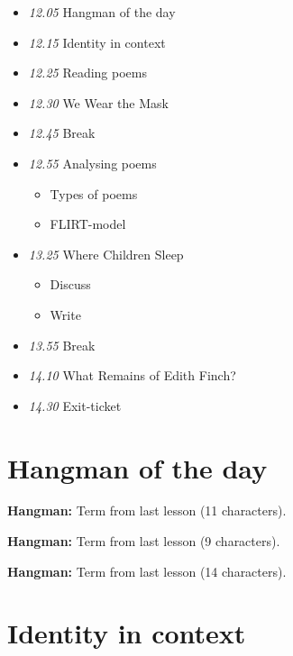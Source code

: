 \documentclass[11pt,a4paper,oneside]{book}
\begin{document}
\begin{itemize}
\item \emph{12.05} Hangman of the day
\item \emph{12.15} Identity in context
\item \emph{12.25} Reading poems
\item \emph{12.30} We Wear the Mask
\item \emph{12.45} Break
\item \emph{12.55} Analysing poems

\begin{itemize}
\item Types of poems
\item FLIRT-model
\end{itemize}

\item \emph{13.25} Where Children Sleep

\begin{itemize}
\item Discuss
\item Write
\end{itemize}

\item \emph{13.55} Break
\item \emph{14.10} What Remains of Edith Finch?
\item \emph{14.30} Exit-ticket
\end{itemize}

\section*{Hangman of the day}
\textbf{Hangman:} Term from last lesson (11 characters).\par\medskip
\textbf{Hangman:} Term from last lesson (9 characters).\par\medskip
\textbf{Hangman:} Term from last lesson (14 characters).\par\medskip

\section*{Identity in context}
\end{document}
